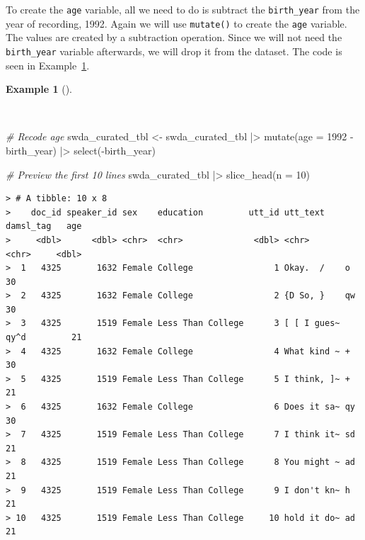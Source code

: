 \documentclass[
  letterpaper,
  DIV=11,
  numbers=noendperiod]{scrreport}
\newenvironment{Shaded}{\begin{snugshade}}{\end{snugshade}}
\newcommand{\AttributeTok}[1]{\textcolor[rgb]{0.00,0.00,0.00}{#1}}
\newcommand{\CommentTok}[1]{\textcolor[rgb]{0.00,0.00,0.00}{\textit{#1}}}
\newcommand{\DecValTok}[1]{\textcolor[rgb]{0.00,0.00,0.00}{#1}}
\newcommand{\FunctionTok}[1]{\textcolor[rgb]{0.00,0.00,0.00}{#1}}
\newcommand{\NormalTok}[1]{\textcolor[rgb]{0.00,0.00,0.00}{#1}}
\newcommand{\OtherTok}[1]{\textcolor[rgb]{0.00,0.00,0.00}{#1}}
\newcommand{\SpecialCharTok}[1]{\textcolor[rgb]{0.00,0.00,0.00}{#1}}
\theoremstyle{definition}
\newtheorem{example}{Example}[chapter]
\theoremstyle{remark}
\begin{document}
To create the \texttt{age} variable, all we need to do is subtract the
\texttt{birth\_year} from the year of recording, 1992. Again we will use
\texttt{mutate()} to create the \texttt{age} variable. The values are
created by a subtraction operation. Since we will not need the
\texttt{birth\_year} variable afterwards, we will drop it from the
dataset. The code is seen in Example~\ref{exm-td-swda-recoding-age}.

\begin{example}[]\protect\hypertarget{exm-td-swda-recoding-age}{}\label{exm-td-swda-recoding-age}

~

\begin{Shaded}
\begin{Highlighting}[]
\CommentTok{\# Recode age}
\NormalTok{swda\_curated\_tbl }\OtherTok{\textless{}{-}} 
\NormalTok{  swda\_curated\_tbl }\SpecialCharTok{|\textgreater{}}
  \FunctionTok{mutate}\NormalTok{(}\AttributeTok{age =} \DecValTok{1992} \SpecialCharTok{{-}}\NormalTok{ birth\_year) }\SpecialCharTok{|\textgreater{}}
  \FunctionTok{select}\NormalTok{(}\SpecialCharTok{{-}}\NormalTok{birth\_year)}

\CommentTok{\# Preview the first 10 lines}
\NormalTok{swda\_curated\_tbl }\SpecialCharTok{|\textgreater{}}
  \FunctionTok{slice\_head}\NormalTok{(}\AttributeTok{n =} \DecValTok{10}\NormalTok{)}
\end{Highlighting}
\end{Shaded}

\begin{verbatim}
> # A tibble: 10 x 8
>    doc_id speaker_id sex    education         utt_id utt_text    damsl_tag   age
>     <dbl>      <dbl> <chr>  <chr>              <dbl> <chr>       <chr>     <dbl>
>  1   4325       1632 Female College                1 Okay.  /    o            30
>  2   4325       1632 Female College                2 {D So, }    qw           30
>  3   4325       1519 Female Less Than College      3 [ [ I gues~ qy^d         21
>  4   4325       1632 Female College                4 What kind ~ +            30
>  5   4325       1519 Female Less Than College      5 I think, ]~ +            21
>  6   4325       1632 Female College                6 Does it sa~ qy           30
>  7   4325       1519 Female Less Than College      7 I think it~ sd           21
>  8   4325       1519 Female Less Than College      8 You might ~ ad           21
>  9   4325       1519 Female Less Than College      9 I don't kn~ h            21
> 10   4325       1519 Female Less Than College     10 hold it do~ ad           21
\end{verbatim}

\end{example}
\end{document}
